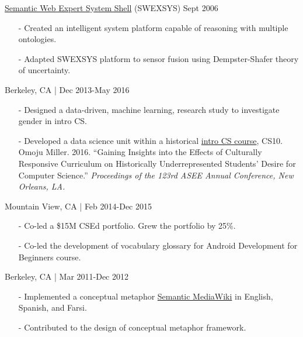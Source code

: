 \documentclass[10.5pt,article,oneside]{memoir}
\begin{document}
\ind \href{https://github.com/omoju/SWEXSYS}{Semantic Web Expert System Shell} (SWEXSYS) \hfill Sept 2006 
\begin{itemize}[noitemsep,nolistsep]
\item[-] Created an intelligent system platform capable of reasoning with multiple ontologies.
\item[-] Adapted SWEXSYS platform to sensor fusion using Dempster-Shafer theory of uncertainty.
\end{itemize} 

\bigskip


\medskip

 \hfill Berkeley, CA | Dec 2013-May 2016
\begin{itemize}[noitemsep,nolistsep]
\item[-] Designed a data-driven, machine learning, research study to investigate gender in intro CS. 
\item[-] Developed a data science unit within a historical \href{http://www.whitehouse.gov/the-press-office/2014/12/08/fact-sheet-new-commitments-support-computer-science-education}{intro CS course}, CS10.\\
\ind Omoju Miller. 2016. ``Gaining Insights into the Effects of Culturally Responsive Curriculum on Historically Underrepresented Students' Desire for Computer Science.'' \emph{Proceedings of the 123rd ASEE Annual Conference, New Orleans, LA.}

\end{itemize} 

 \hfill Mountain View, CA | Feb 2014-Dec 2015
\begin{itemize}[noitemsep,nolistsep]
\item[-]Co-led a \$15M CSEd portfolio. Grew the portfolio by 25\%.
\item[-]Co-led the development of vocabulary glossary for Android Development for Beginners course.
\end{itemize} 

 \hfill Berkeley, CA | Mar 2011-Dec 2012
\begin{itemize}[noitemsep,nolistsep]
\item[-] Implemented a conceptual metaphor \href{http://metaphor.icsi.berkeley.edu}{Semantic MediaWiki} in English, Spanish, and Farsi.
\item[-] Contributed to the design of conceptual metaphor framework.
\end{itemize} 
\end{document}
